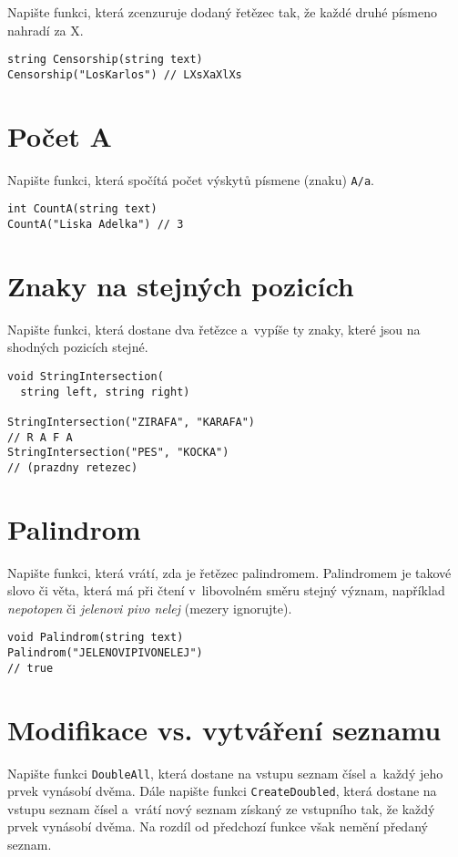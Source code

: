 \documentclass[12pt,a4paper]{article}
\begin{document}
\begin{multicols}{2}
Napište funkci, která zcenzuruje dodaný řetězec tak, že každé druhé písmeno nahradí za X.

\begin{verbatim}
string Censorship(string text)
Censorship("LosKarlos") // LXsXaXlXs
\end{verbatim}

\section{Počet A}

Napište funkci, která spočítá počet výskytů písmene (znaku) \texttt{A/a}.

\begin{verbatim}
int CountA(string text)
CountA("Liska Adelka") // 3
\end{verbatim}

\section{Znaky na stejných pozicích}

Napište funkci, která dostane dva řetězce a~vypíše ty znaky, které jsou na
shodných pozicích stejné.

\begin{verbatim}
void StringIntersection(
  string left, string right)

StringIntersection("ZIRAFA", "KARAFA")
// R A F A
StringIntersection("PES", "KOCKA")
// (prazdny retezec)
\end{verbatim}

\section{Palindrom}

Napište funkci, která vrátí, zda je řetězec palindromem. Palindromem je takové
slovo či věta, která má při čtení v~libovolném směru stejný význam, například
\textit{nepotopen} či \textit{jelenovi pivo nelej} (mezery ignorujte).

\begin{verbatim}
void Palindrom(string text)
Palindrom("JELENOVIPIVONELEJ")
// true
\end{verbatim}

\section{Modifikace vs. vytváření seznamu}

Napište funkci \texttt{DoubleAll}, která dostane na vstupu seznam čísel
a~každý jeho prvek vynásobí dvěma. Dále napište funkci \texttt{CreateDoubled},
která dostane na vstupu seznam čísel a~vrátí nový seznam získaný ze vstupního
tak, že každý prvek vynásobí dvěma. Na rozdíl od předchozí funkce však nemění
předaný seznam.

\end{multicols}
\end{document}
